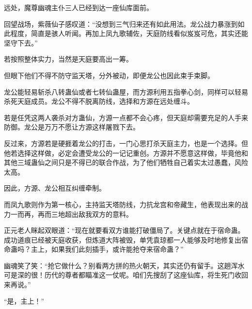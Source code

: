 \begin{this_body}
远处，魔尊幽魂主仆三人已经到达一座仙库面前。

回望战场，紫薇仙子感叹道：“没想到三气归来还有如此用法。龙公战力暴涨到如此程度，简直是骇人听闻。再加上凤九歌辅佐，天庭防线看似岌岌可危，其实还能坚守下去。”

若按照整体实力，当然是天庭要高出一筹。

但眼下他们不得不防守监天塔，分外被动，即便龙公也因此束手束脚。

龙公能轻易斩杀八转蛊仙或者七转仙蛊屋，而方源利用五指拳心剑，同样可以轻易杀死天庭成员。龙公不得不脱离防线，选择和方源在远处缠斗。

若是任凭这两人袭杀对方蛊仙，方源一点都不会心疼，但天庭却需要充足的人手来防御。龙公是万万不愿让方源这样屠戮下去。

反过来，方源若是硬捱着龙公的打击，一门心思打杀天庭主力，也是一个选择。但他若选择这样做，必定会遭受龙公的一记记重创。方源并不愿意这样做，毕竟他和其他三域蛊仙之间只是不得已的联合作战，为了他们牺牲自己着实太过愚蠢，风险太高。

因此，方源、龙公相互纠缠牵制。

而凤九歌则作为第一核心，主持监天塔防线，力抗龙宫和帝藏生，他表现出来的战力一而再，再而三地超出敌我双方的意料。

正元老人眯起双眼道：“现在就要看双方谁能打破僵局了。关键点就在于宿命蛊。成功道痕已经被天庭收获，但炼道大阵被毁，单凭袁琼都一人能够及时地修复出宿命蛊吗？主上，如果我们此刻插手，或许能抢夺来宿命蛊？”

幽魂笑了笑：“抢它做什么？别看两方拼的热火朝天，其实还仍有留手。这趟浑水可是深的很！历代的尊者都瞄准这一仗呢。咱们先搜刮了这座仙库，将生死门收回来再说。”

“是，主上！”

\end{this_body}

